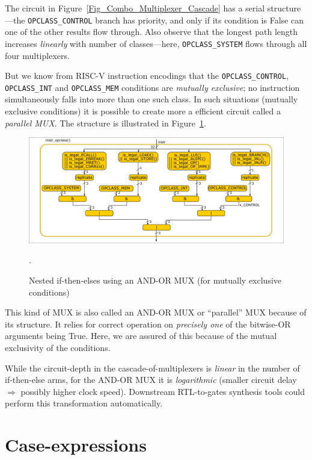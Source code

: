 The circuit in Figure~\ref{Fig_Combo_Multiplexer_Cascade} has a serial
structure---the \verb|OPCLASS_CONTROL| branch has priority, and only
if its condition is False can one of the other results flow through.
Also observe that the longest path length increases \emph{linearly}
with number of classes---here, \verb|OPCLASS_SYSTEM| flows through all
four multiplexers.

But we know from RISC-V instruction encodings that the
\verb|OPCLASS_CONTROL|, \verb|OPCLASS_INT| and \verb|OPCLASS_MEM|
conditions are \emph{mutually exclusive}; no instruction
simultaneously falls into more than one such class.  In such
situations (mutually exclusive conditions) it is possible to create
more a efficient circuit called a \emph{parallel MUX}.  The structure
is illustrated in Figure~\ref{Fig_Combo_Multiplexer_Parallel}.
\begin{figure}[htbp]
  \centerline{\includegraphics[width=6in,angle=0]{Figures/Fig_Combo_Multiplexer_Parallel}}
  \caption{\label{Fig_Combo_Multiplexer_Parallel}
           Nested if-then-elses using an AND-OR MUX (for mutually exclusive conditions)}.
\end{figure}

This kind of MUX is also called an AND-OR MUX or ``parallel'' MUX
because of its structure.  It relies for correct operation on
\emph{precisely one} of the bitwise-OR arguments being True.  Here, we
are assured of this because of the mutual exclusivity of the
conditions.

While the circuit-depth in the cascade-of-multiplexers is
\emph{linear} in the number of if-then-else arms, for the AND-OR MUX
it is \emph{logarithmic} (smaller circuit delay $\Longrightarrow$
possibly higher clock speed).  Downstream RTL-to-gates synthesis tools
could perform this transformation automatically.


\section{Case-expressions}

